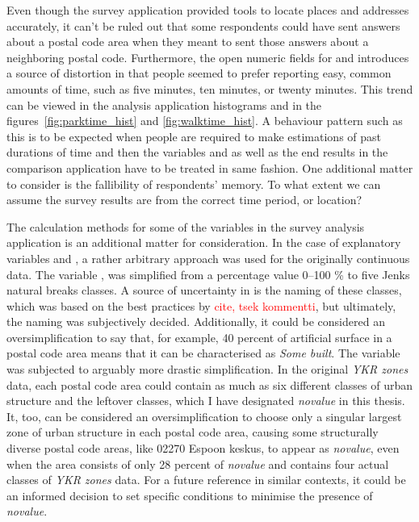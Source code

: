 Even though the survey application provided tools to locate places and addresses accurately, it can't be ruled out that some respondents could have sent answers about a postal code area when they meant to sent those answers about a neighboring postal code. Furthermore, the open numeric fields for  and  introduces a source of distortion in that people seemed to prefer reporting easy, common amounts of time, such as five minutes, ten minutes, or twenty minutes. This trend can be viewed in the analysis application histograms and in the figures~\ref{fig:parktime_hist} and \ref{fig:walktime_hist}. A behaviour pattern such as this is to be expected when people are required to make estimations of past durations of time and then the variables  and  as well as the end results in the comparison application have to be treated in same fashion. One additional matter to consider is the fallibility of respondents' memory. To what extent we can assume the survey results are from the correct time period, or location?

The calculation methods for some of the variables in the survey analysis application is an additional matter for consideration. In the case of explanatory variables  and , a rather arbitrary approach was used for the originally continuous data. The variable , was simplified from a percentage value 0--100 \% to five Jenks natural breaks classes. A source of uncertainty in  is the naming of these classes, which was based on the best practices by \textcolor{red}{cite, tsek kommentti}, but ultimately, the naming was subjectively decided. Additionally, it could be considered an oversimplification to say that, for example, 40 percent of artificial surface in a postal code area means that it can be characterised as \textit{Some built}. The variable  was subjected to arguably more drastic simplification. In the original \textit{YKR zones} data, each postal code area could contain as much as six different classes of urban structure and the leftover classes, which I have designated \textit{novalue} in this thesis. It, too, can be considered an oversimplification to choose only a singular largest zone of urban structure in each postal code area, causing some structurally diverse postal code areas, like 02270 Espoon keskus, to appear as \textit{novalue}, even when the area consists of only 28 percent of \textit{novalue} and contains four actual classes of \textit{YKR zones} data. For a future reference in similar contexts, it could be an informed decision to set specific conditions to minimise the presence of \textit{novalue}.


